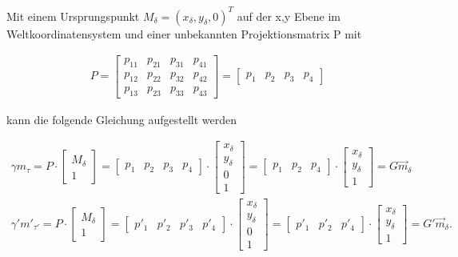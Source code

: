 Mit einem Ursprungspunkt $M_\delta=(x_\delta,y_\delta,0)^T$ auf der x,y Ebene im Weltkoordinatensystem und einer unbekannten Projektionsmatrix P mit

\begin{gather}
	P=
	\begin{bmatrix}
		p_{11}&p_{21}&p_{31}&p_{41}\\
		p_{12}&p_{22}&p_{32}&p_{42}\\
		p_{13}&p_{23}&p_{33}&p_{43}
	\end{bmatrix}=	\begin{bmatrix}
		p_1&p_2&p_3&p_4
	\end{bmatrix}
\end{gather} 

kann die folgende Gleichung aufgestellt werden \cite{Elements}


\begin{gather}
	\gamma m_\tau = P \cdot 
	\begin{bmatrix}
		M_\delta\\1
	\end{bmatrix} = 
	\begin{bmatrix}
		p_1&p_2&p_3&p_4
	\end{bmatrix} \cdot
	\begin{bmatrix}
		x_\delta\\y_\delta\\0\\1
	\end{bmatrix}=
	\begin{bmatrix}
		p_1&p_2&p_4
	\end{bmatrix} \cdot
	\begin{bmatrix}
		x_\delta\\y_\delta\\1
	\end{bmatrix}=
	G \vec{m}_\delta\\
	\gamma' m'_{\tau'} = P \cdot 
	\begin{bmatrix}
		M_\delta\\1
	\end{bmatrix} = 
	\begin{bmatrix}
		p'_1&p'_2&p'_3&p'_4
	\end{bmatrix} \cdot
	\begin{bmatrix}
		x_\delta\\y_\delta\\0\\1
	\end{bmatrix}=
	\begin{bmatrix}
		p'_1&p'_2&p'_4
	\end{bmatrix} \cdot
	\begin{bmatrix}
		x_\delta\\y_\delta\\1
	\end{bmatrix}=
	G' \vec{m}_{\delta}. 
\end{gather}\\


